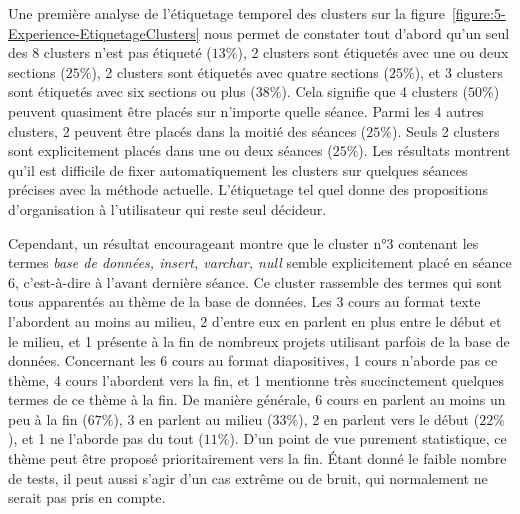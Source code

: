 \vfill
\hspace{0pt}


\newpage

Une première analyse de l'étiquetage temporel des clusters sur la figure~\ref{figure:5-Experience-EtiquetageClusters} nous permet de constater tout d'abord qu'un seul des 8 clusters n'est pas étiqueté ($ 13\% $), 2 clusters sont étiquetés avec une ou deux sections ($ 25\% $), 2 clusters sont étiquetés avec quatre sections ($ 25\% $), et 3 clusters sont étiquetés avec six sections ou plus ($ 38\% $).
Cela signifie que 4 clusters ($ 50\% $) peuvent quasiment être placés sur n'importe quelle séance.
Parmi les 4 autres clusters, 2 peuvent être placés dans la moitié des séances ($ 25\% $).
Seuls 2 clusters sont explicitement placés dans une ou deux séances ($ 25\% $).
Les résultats montrent qu'il est difficile de fixer automatiquement les clusters sur quelques séances précises avec la méthode actuelle.
L'étiquetage tel quel donne des propositions d'organisation à l'utilisateur qui reste seul décideur.

\bigskip

Cependant, un résultat encourageant montre que le cluster n°3 contenant les termes \og \textit{base de données, insert, varchar, null} \fg semble explicitement placé en séance 6, c'est-à-dire à l'avant dernière séance.
Ce cluster rassemble des termes qui sont tous apparentés au thème de la base de données.
Les 3 cours au format texte l'abordent au moins au milieu, 2 d'entre eux en parlent en plus entre le début et le milieu, et 1 présente à la fin de nombreux projets utilisant parfois de la base de données.
Concernant les 6 cours au format diapositives, 1 cours n'aborde pas ce thème, 4 cours l'abordent vers la fin, et 1 mentionne très succinctement quelques termes de ce thème à la fin.
De manière générale, 6 cours en parlent au moins un peu à la fin ($ 67\% $), 3 en parlent au milieu ($ 33\% $), 2 en parlent vers le début ($ 22\% $), et 1 ne l'aborde pas du tout ($ 11\% $).
D'un point de vue purement statistique, ce thème peut être proposé prioritairement vers la fin.
Étant donné le faible nombre de tests, il peut aussi s'agir d'un cas extrême ou de bruit, qui normalement ne serait pas pris en compte.

\bigskip

